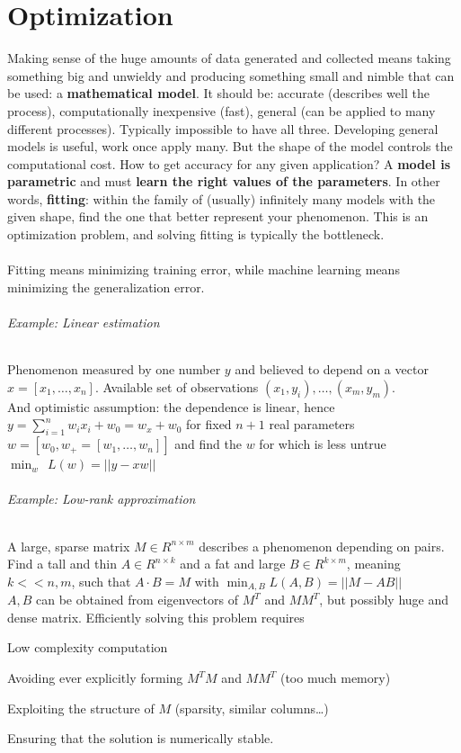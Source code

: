 \documentclass[10pt]{report}
\begin{document}
\chapter{Optimization}
Making sense of the huge amounts of data generated and collected means taking something big and unwieldy and producing something small and nimble that can be used: a \textbf{mathematical model}. It should be: accurate (describes well the process), computationally inexpensive (fast), general (can be applied to many different processes). Typically impossible to have all three. Developing general models is useful, work once apply many. But the shape of the model controls the computational cost. How to get accuracy for any given application? A \textbf{model is parametric} and must \textbf{learn the right values of the parameters}. In other words, \textbf{fitting}: within the family of (usually) infinitely many models with the given shape, find the one that better represent your phenomenon. This is an optimization problem, and solving fitting is typically the bottleneck.\\\\
Fitting means minimizing training error, while machine learning means minimizing the generalization error.
\subparagraph{Example: Linear estimation} Phenomenon measured by one number $y$ and believed to depend on a vector $x = [x_1,\ldots,x_n]$. Available set of observations $(x_1,y_i), \ldots, (x_m, y_m)$.\\
And optimistic assumption: the dependence is linear, hence $y = \sum_{i=1}^n w_ix_i+w_0 = w_x + w_0$ for fixed $n+1$ real parameters $w = [w_0, w_+=[w_1,\ldots,w_n]]$ and find the $w$ for which is less untrue $\min_w\:\:L(w)=||y-xw||$
\subparagraph{Example: Low-rank approximation} A large, sparse matrix $M\in R^{n\times m}$ describes a phenomenon depending on pairs. Find a tall and thin $A\in R^{n\times k}$ and a fat and large $B\in R^{k\times m}$, meaning $k << n,m$, such that $A\cdot B = M$ with $\min_{A,B} L(A,B) = ||M-AB||$\\
$A,B$ can be obtained from eigenvectors of $M^T$ and $MM^T$, but possibly huge and dense matrix. Efficiently solving this problem requires
\begin{list}{}{}
	\item Low complexity computation
	\item Avoiding ever explicitly forming $M^TM$ and $MM^T$ (too much memory)
	\item Exploiting the structure of $M$ (sparsity, similar columns\ldots)
	\item Ensuring that the solution is numerically stable.
\end{list}
\end{document}
